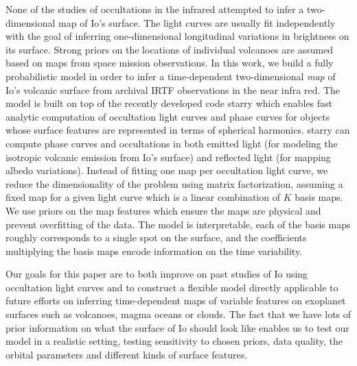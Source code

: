 \documentclass[modern]{aastex62}
\begin{document}
None of the studies of occultations in the infrared attempted to infer a two-dimensional map of Io's surface.
The light curves are usually fit independently with the goal of inferring one-dimensional longitudinal variations in brightness on its surface.
Strong priors on the locations of individual volcanoes are assumed based on maps from space mission observations.
In this work, we build a fully probabilistic model in order to infer a time-dependent two-dimensional \emph{map} of Io's volcanic surface from archival IRTF observations in the near infra red.
The model is built on top of the recently developed code starry \citep[][Luger et al. 2020 in prep]{luger_starry_2019} which
enables fast analytic computation of occultation light curves and phase curves for objects whose surface features are represented in terms of spherical harmonics.
starry can compute phase curves and occultations in both emitted light (for modeling the isotropic volcanic emission from Io's surface) and reflected light (for mapping albedo variations).
Instead of fitting one map per occultation light curve, we reduce the dimensionality of the problem using matrix factorization, assuming a fixed map for a given light curve which is a linear combination of $K$ basis maps.
We use priors on the map features which ensure the maps are physical and prevent overfitting of the data.
The model is interpretable, each of the basis maps roughly corresponds to a single spot on the surface, and the coefficients multiplying the basis maps encode information on the time variability.

Our goals for this paper are to both improve on past studies of Io using occultation light curves and to construct a flexible model directly applicable to future efforts on inferring time-dependent maps of variable features on exoplanet surfaces such as volcanoes, magma oceans or clouds.
The fact that we have lots of prior information on what the surface of Io should look like enables us to test our model in a realistic setting, testing sensitivity to chosen priors, data quality, the orbital parameters and different kinds of surface features.
\end{document}
